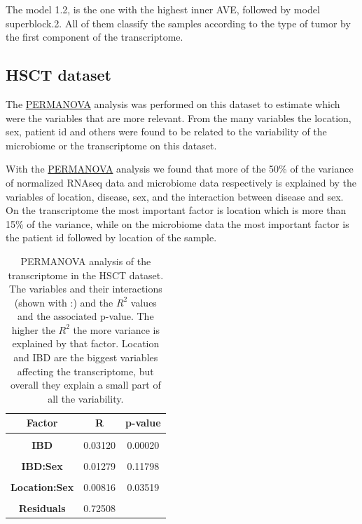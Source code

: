 \documentclass[
  12pt,
  a4paper,
  twoside,
  openright]{book}
\begin{document}
The model 1.2, is the one with the highest inner AVE, followed by model superblock.2.
All of them classify the samples according to the type of tumor by the first component of the transcriptome.

\FloatBarrier

\hypertarget{results-hsct}{%
\subsection{HSCT dataset}\label{results-hsct}}

The \protect\hyperlink{acronyms_PERMANOVA}{PERMANOVA} analysis was performed on this dataset to estimate which were the variables that are more relevant.
From the many variables the location, sex, patient id and others were found to be related to the variability of the microbiome or the transcriptome on this dataset.

With the \protect\hyperlink{acronyms_PERMANOVA}{PERMANOVA} analysis we found that more of the 50\% of the variance of normalized RNAseq data and microbiome data respectively is explained by the variables of location, disease, sex, and the interaction between disease and sex.
On the transcriptome the most important factor is location which is more than 15\% of the variance, while on the microbiome data the most important factor is the patient id followed by location of the sample.

\begin{table}[H]

\caption[PERMANOVA analysis of the transcriptome in the HSCT dataset.]{\label{tab:hsct-permanova-RNAseq}PERMANOVA analysis of the transcriptome in the HSCT dataset. The variables and their interactions (shown with :) and the $R^2$ values and the associated p-value. The higher the $R^2$ the more variance is explained by that factor. Location and IBD are the biggest variables affecting the transcriptome, but overall they explain a small part of all the variability.}
\centering
\begin{tabular}[t]{>{}c|c|c}
\hline
\textbf{Factor} & \textbf{R} & \textbf{p-value}\\
\hline
\textbf{\cellcolor{gray!6}{Location}} & \cellcolor{gray!6}{0.18057} & \cellcolor{gray!6}{0.00020}\\
\hline
\textbf{IBD} & 0.03120 & 0.00020\\
\hline
\textbf{\cellcolor{gray!6}{Sex}} & \cellcolor{gray!6}{0.01306} & \cellcolor{gray!6}{0.00120}\\
\hline
\textbf{IBD:Sex} & 0.01279 & 0.11798\\
\hline
\textbf{\cellcolor{gray!6}{Location:IBD}} & \cellcolor{gray!6}{0.02427} & \cellcolor{gray!6}{0.11458}\\
\hline
\textbf{Location:Sex} & 0.00816 & 0.03519\\
\hline
\textbf{\cellcolor{gray!6}{Location:IBD:Sex}} & \cellcolor{gray!6}{0.00486} & \cellcolor{gray!6}{0.52190}\\
\hline
\textbf{Residuals} & 0.72508 & \\
\hline
\end{tabular}
\end{table}
\end{document}
